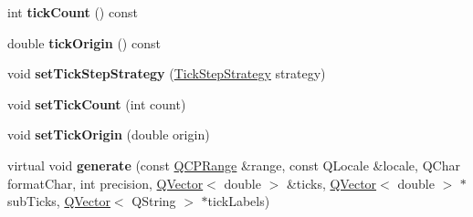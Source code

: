 \begin{DoxyCompactItemize}
\item 
int {\bfseries tick\+Count} () const \hypertarget{class_q_c_p_axis_ticker_a860d9fbe9762abd19560b27b2b803f14}{}\label{class_q_c_p_axis_ticker_a860d9fbe9762abd19560b27b2b803f14}

\item 
double {\bfseries tick\+Origin} () const \hypertarget{class_q_c_p_axis_ticker_a521d8e0d3dc5b711bad3582c1473d333}{}\label{class_q_c_p_axis_ticker_a521d8e0d3dc5b711bad3582c1473d333}

\item 
void {\bfseries set\+Tick\+Step\+Strategy} (\hyperlink{class_q_c_p_axis_ticker_ab6d2f9d9477821623ac9bc4b21ddf49a}{Tick\+Step\+Strategy} strategy)\hypertarget{class_q_c_p_axis_ticker_a73b1d847c1a12159af6bfda4ebebe7d5}{}\label{class_q_c_p_axis_ticker_a73b1d847c1a12159af6bfda4ebebe7d5}

\item 
void {\bfseries set\+Tick\+Count} (int count)\hypertarget{class_q_c_p_axis_ticker_a47752abba8293e6dc18491501ae34008}{}\label{class_q_c_p_axis_ticker_a47752abba8293e6dc18491501ae34008}

\item 
void {\bfseries set\+Tick\+Origin} (double origin)\hypertarget{class_q_c_p_axis_ticker_ab509c7e500293bf66a8409f0d7c23943}{}\label{class_q_c_p_axis_ticker_ab509c7e500293bf66a8409f0d7c23943}

\item 
virtual void {\bfseries generate} (const \hyperlink{class_q_c_p_range}{Q\+C\+P\+Range} \&range, const Q\+Locale \&locale, Q\+Char format\+Char, int precision, \hyperlink{class_q_vector}{Q\+Vector}$<$ double $>$ \&ticks, \hyperlink{class_q_vector}{Q\+Vector}$<$ double $>$ $\ast$sub\+Ticks, \hyperlink{class_q_vector}{Q\+Vector}$<$ Q\+String $>$ $\ast$tick\+Labels)\hypertarget{class_q_c_p_axis_ticker_ae11e785e1d9ecfe7d4ba1292551b4a46}{}\label{class_q_c_p_axis_ticker_ae11e785e1d9ecfe7d4ba1292551b4a46}

\end{DoxyCompactItemize}
